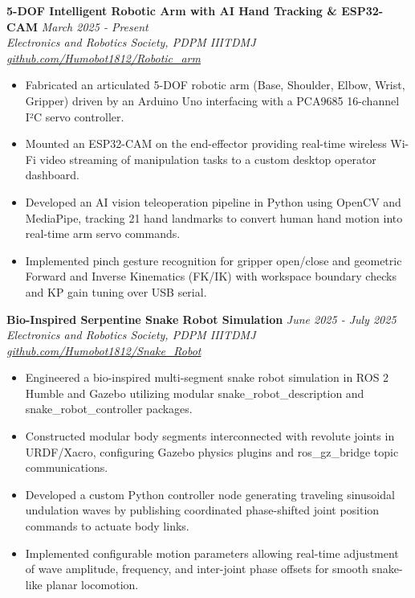 \documentclass[10pt,a4paper]{article}
\begin{document}
\vspace{3pt}
\textbf{5-DOF Intelligent Robotic Arm with AI Hand Tracking \& ESP32-CAM} \hfill \textit{March 2025 - Present}\\
\textit{Electronics and Robotics Society, PDPM IIITDMJ} \hfill \textit{\href{https://github.com/Humobot1812/Robotic_arm}{github.com/Humobot1812/Robotic\_arm}}
\begin{itemize}[leftmargin=1.2rem,itemsep=1.5pt,topsep=2pt,parsep=0pt]
  \item Fabricated an articulated 5-DOF robotic arm (Base, Shoulder, Elbow, Wrist, Gripper) driven by an Arduino Uno interfacing with a PCA9685 16-channel I²C servo controller.
  \item Mounted an ESP32-CAM on the end-effector providing real-time wireless Wi-Fi video streaming of manipulation tasks to a custom desktop operator dashboard.
  \item Developed an AI vision teleoperation pipeline in Python using OpenCV and MediaPipe, tracking 21 hand landmarks to convert human hand motion into real-time arm servo commands.
  \item Implemented pinch gesture recognition for gripper open/close and geometric Forward and Inverse Kinematics (FK/IK) with workspace boundary checks and KP gain tuning over USB serial.
\end{itemize}

\vspace{3pt}
\textbf{Bio-Inspired Serpentine Snake Robot Simulation} \hfill \textit{June 2025 - July 2025}\\
\textit{Electronics and Robotics Society, PDPM IIITDMJ} \hfill \textit{\href{https://github.com/Humobot1812/Snake_Robot}{github.com/Humobot1812/Snake\_Robot}}
\begin{itemize}[leftmargin=1.2rem,itemsep=1.5pt,topsep=2pt,parsep=0pt]
  \item Engineered a bio-inspired multi-segment snake robot simulation in ROS 2 Humble and Gazebo utilizing modular snake\_robot\_description and snake\_robot\_controller packages.
  \item Constructed modular body segments interconnected with revolute joints in URDF/Xacro, configuring Gazebo physics plugins and ros\_gz\_bridge topic communications.
  \item Developed a custom Python controller node generating traveling sinusoidal undulation waves by publishing coordinated phase-shifted joint position commands to actuate body links.
  \item Implemented configurable motion parameters allowing real-time adjustment of wave amplitude, frequency, and inter-joint phase offsets for smooth snake-like planar locomotion.
\end{itemize}
\end{document}

